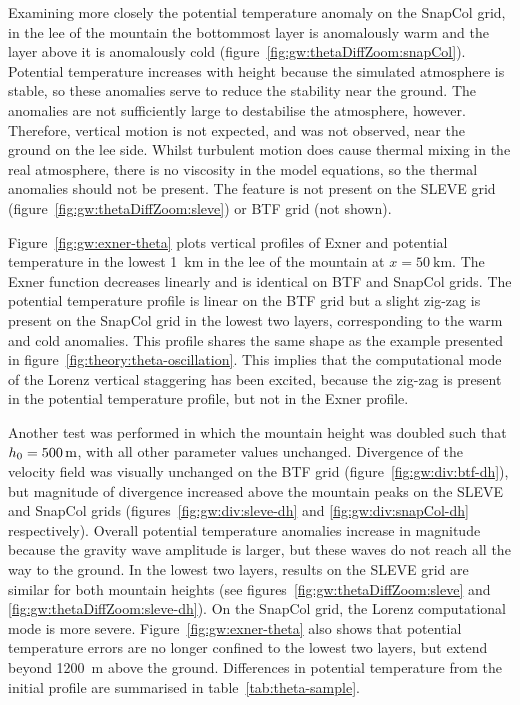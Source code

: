 Examining more closely the potential temperature anomaly on the SnapCol grid, in the lee of the mountain the bottommost layer is anomalously warm and the layer above it is anomalously cold (figure~\ref{fig:gw:thetaDiffZoom:snapCol}).  Potential temperature increases with height because the simulated atmosphere is stable, so these anomalies serve to reduce the stability near the ground.  The anomalies are not sufficiently large to destabilise the atmosphere, however.   Therefore, vertical motion is not expected, and was not observed, near the ground on the lee side.   Whilst turbulent motion does cause thermal mixing in the real atmosphere, there is no viscosity in the model equations, so the thermal anomalies should not be present.  The feature is not present on the SLEVE grid (figure~\ref{fig:gw:thetaDiffZoom:sleve}) or BTF grid (not shown).

Figure~\ref{fig:gw:exner-theta} plots vertical profiles of Exner and potential temperature in the lowest \SI{1}{\kilo\meter} in the lee of the mountain at $x = \SI{50}{\kilo\meter}$.  The Exner function decreases linearly and is identical on BTF and SnapCol grids.  The potential temperature profile is linear on the BTF grid but a slight zig-zag is present on the SnapCol grid in the lowest two layers, corresponding to the warm and cold anomalies.  This profile shares the same shape as the example presented in figure~\ref{fig:theory:theta-oscillation}.
This implies that the computational mode of the Lorenz vertical staggering has been excited, because the zig-zag is present in the potential temperature profile, but not in the Exner profile.

Another test was performed in which the mountain height was doubled such that $h_0 = \SI{500}{\meter}$, with all other parameter values unchanged.  Divergence of the velocity field was visually unchanged on the BTF grid (figure~\ref{fig:gw:div:btf-dh}), but magnitude of divergence increased above the mountain peaks on the SLEVE and SnapCol grids (figures~\ref{fig:gw:div:sleve-dh} and \ref{fig:gw:div:snapCol-dh} respectively).
Overall potential temperature anomalies increase in magnitude because the gravity wave amplitude is larger, but these waves do not reach all the way to the ground.  In the lowest two layers, results on the SLEVE grid are similar for both mountain heights (see figures~\ref{fig:gw:thetaDiffZoom:sleve} and \ref{fig:gw:thetaDiffZoom:sleve-dh}).  On the SnapCol grid, the Lorenz computational mode is more severe.  Figure~\ref{fig:gw:exner-theta} also shows that potential temperature errors are no longer confined to the lowest two layers, but extend beyond \SI{1200}{\meter} above the ground.  Differences in potential temperature from the initial profile are summarised in table~\ref{tab:theta-sample}.

